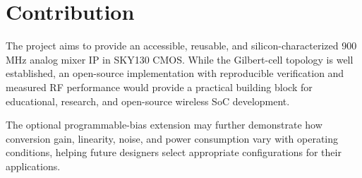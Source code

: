 
\section{Contribution}

The project aims to provide an accessible, reusable, and silicon-characterized 900 MHz analog mixer IP in SKY130 CMOS.
While the Gilbert-cell topology is well established, an open-source implementation with reproducible verification and measured RF performance would provide a practical building block for educational, research, and open-source wireless SoC development.

The optional programmable-bias extension may further demonstrate how conversion gain, linearity, noise, and power consumption vary with operating conditions, helping future designers select appropriate configurations for their applications.
